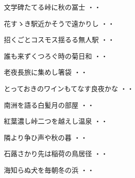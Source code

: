 \begin{shiika}文学碑たてる峠に秋の冨士
\hfill{・・}\end{shiika}
\vspace{0.6cm}
\begin{shiika}花すゝき駅近かそうで遠かりし
\hfill{・・}\end{shiika}
\vspace{0.6cm}
\begin{shiika}招くごとコスモス揺るる無人駅
\hfill{・・}\end{shiika}
\vspace{0.6cm}
\begin{shiika}誰も来ずくつろぐ時の菊日和
\hfill{・・}\end{shiika}
\vspace{0.6cm}
\begin{shiika}老夜長旅に集めし箸袋
\hfill{・・}\end{shiika}
\vspace{0.6cm}
\begin{shiika}とっておきのワインもてなす良夜かな
\hfill{・・}\end{shiika}
\vspace{0.6cm}
\begin{shiika}南洲を語る白髪月の部屋
\hfill{・・}\end{shiika}
\vspace{0.6cm}
\begin{shiika}紅葉濃し峠二つを越えし温泉
\hfill{・・}\end{shiika}
\vspace{0.6cm}
\begin{shiika}隣より争ひ声や秋の暮
\hfill{・・}\end{shiika}
\vspace{0.6cm}
\begin{shiika}石蕗さかり先は稲荷の鳥居径
\hfill{・・}\end{shiika}
\vspace{0.6cm}
\begin{shiika}海知らぬ犬を毎朝冬の浜
\hfill{・・}\end{shiika}
\vspace{0.6cm}
